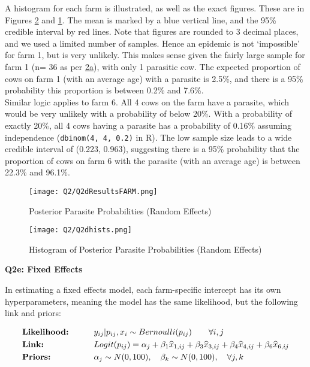 \documentclass[11pt]{article}
\begin{document}
A histogram for each farm is illustrated, as well as the exact figures. These are in Figures \ref{Fig::2dHists} and \ref{Fig::2dResultsFARM}. The mean is marked by a blue vertical line, and the 95\% credible interval by red lines. Note that figures are rounded to 3 decimal places, and we used a limited number of samples. Hence an epidemic is not `impossible' for farm 1, but is very unlikely. This makes sense given the fairly large sample for farm 1 (n= 36 as per \hyperref[sec::2a]{2a}), with only 1 parasitic cow. The expected proportion of cows on farm 1 (with an average age) with a parasite is 2.5\%, and there is a 95\% probability this proportion is between 0.2\% and 7.6\%. \\
Similar logic applies to farm 6. All 4 cows on the farm have a parasite, which would be very unlikely with a probability of below 20\%. With a probability of exactly 20\%, all 4 cows having a parasite has a probability of 0.16\% assuming independence (\texttt{dbinom(4, 4, 0.2)} in R). The low sample size leads to a wide credible interval of (0.223, 0.963), suggesting there is a 95\% probability that the proportion of cows on farm 6 with the parasite (with an average age) is between 22.3\% and 96.1\%. 

\begin{figure}[!h]
\centering
\texttt{[image: Q2/Q2dResultsFARM.png]}
\caption{Posterior Parasite Probabilities (Random Effects)} \label{Fig::2dResultsFARM}
\end{figure}


\begin{figure}[!h]
\centering
\texttt{[image: Q2/Q2dhists.png]}
\caption{Histogram of Posterior Parasite Probabilities (Random Effects)} \label{Fig::2dHists}
\end{figure}


\newpage
\textbf{Q2e: Fixed Effects}

In estimating a fixed effects model, each farm-specific intercept has its own hyperparameters, meaning the model has the same likelihood, but the following link and priors:

\begin{align*}
&\text{\textbf{Likelihood:}} \qquad &&y_{ij} | p_{ij}, x_i \sim Bernoulli(p_{ij}) \qquad \forall i, j\\
&\text{\textbf{Link:}} \qquad &&Logit(p_{ij}) = \alpha_j + \beta_1 \widehat{x}_{1, ij} +  \beta_3 \widehat{x}_{3, ij} + \beta_4 \widehat{x}_{4, ij} +  \beta_6 \widehat{x}_{6, ij} \\
&\text{\textbf{Priors:}}        &&\alpha_j \sim N(0, 100),  \quad \beta_k \sim N(0, 100), \quad \forall j, k\\
\end{align*}
\end{document}
